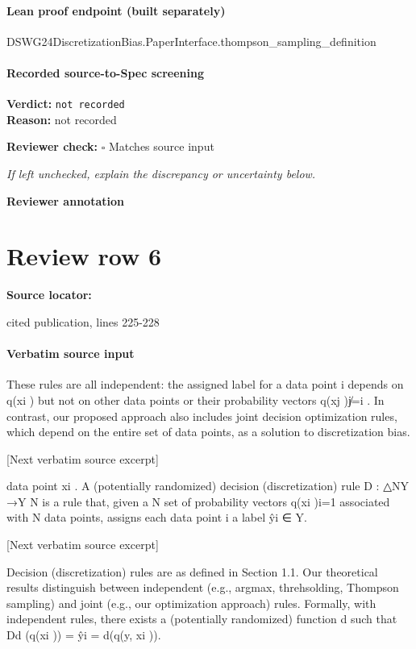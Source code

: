 \documentclass[10pt]{article}
\newcommand{\reviewerbox}{%
  \par\noindent\fbox{\parbox{0.96\linewidth}{\rule{0pt}{0.38in}}}\par
}
\newcommand{\reviewmatch}[1]{%
  \par\noindent\textbf{Reviewer check:} $\square$\; #1\par
  \noindent\emph{If left unchecked, explain the discrepancy or uncertainty below.}\par
}
\begin{document}
\paragraph{Lean proof endpoint (built separately)}\begin{ReviewVerbatim}
DSWG24DiscretizationBias.PaperInterface.thompson_sampling_definition
\end{ReviewVerbatim}

\paragraph{Recorded source-to-Spec screening}
\textbf{Verdict:} \texttt{not recorded}
\\
\textbf{Reason:} not recorded
\reviewmatch{Matches source input}
\noindent\textbf{Reviewer annotation}\par
\reviewerbox
\clearpage
\hypertarget{source-claim-4822dab29e865f72}{}
\section*{Review row 6}
\textbf{Source locator:} {\footnotesize\raggedright cited publication, lines 225-\allowbreak{}228\par}
\paragraph{Verbatim source input}
\begin{ReviewVerbatim}
These rules are all independent: the assigned label for a data point i depends on q(xi ) but not on other
data points or their probability vectors {q(xj )}j̸=i .
    In contrast, our proposed approach also includes joint decision optimization rules, which depend on the
entire set of data points, as a solution to discretization bias.

[Next verbatim source excerpt]

data point xi . A (potentially randomized) decision (discretization) rule D : △NY →Y
                                                                                      N
                                                                                         is a rule that, given a
                                   N
set of probability vectors {q(xi )}i=1 associated with N data points, assigns each data point i a label ŷi ∈ Y.

[Next verbatim source excerpt]

    Decision (discretization) rules are as defined in Section 1.1. Our theoretical results distinguish between
independent (e.g., argmax, threhsolding, Thompson sampling) and joint (e.g., our optimization approach)
rules. Formally, with independent rules, there exists a (potentially randomized) function d such that
Dd ({q(xi )}) = {ŷi = d(q(y, xi ))}.
\end{ReviewVerbatim}
\end{document}
